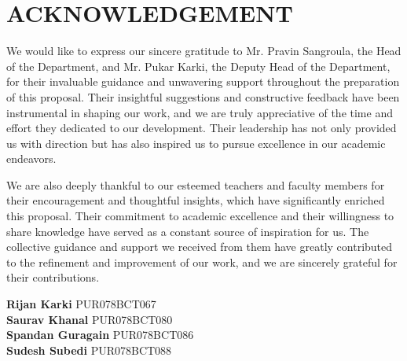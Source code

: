 \chapter*{ACKNOWLEDGEMENT}

We would like to express our sincere gratitude to Mr. Pravin Sangroula, the Head of the Department, and Mr. Pukar Karki, the Deputy Head of the Department, for their invaluable guidance and unwavering support throughout the preparation of this proposal. Their insightful suggestions and constructive feedback have been instrumental in shaping our work, and we are truly appreciative of the time and effort they dedicated to our development. Their leadership has not only provided us with direction but has also inspired us to pursue excellence in our academic endeavors.

We are also deeply thankful to our esteemed teachers and faculty members for their encouragement and thoughtful insights, which have significantly enriched this proposal. Their commitment to academic excellence and their willingness to share knowledge have served as a constant source of inspiration for us. The collective guidance and support we received from them have greatly contributed to the refinement and improvement of our work, and we are sincerely grateful for their contributions.

\vspace{1cm}
\textbf{Rijan Karki} 
PUR078BCT067\\
\textbf{Saurav Khanal} 
PUR078BCT080\\
\textbf{Spandan Guragain} 
PUR078BCT086\\
\textbf{Sudesh Subedi} 
PUR078BCT088\\
